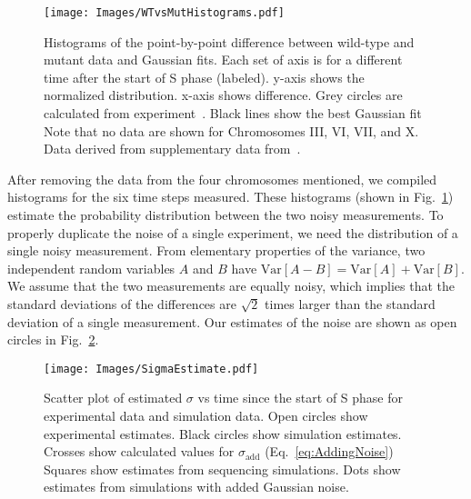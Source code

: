 		\begin{figure}[tbh]
			\begin{center}
				\texttt{[image: Images/WTvsMutHistograms.pdf]}
			\end{center}
				\caption[Estimating Experimental Noise: Point-By-Point Difference Distributions]{\label{fig:HistDifference} Histograms of the point-by-point difference between wild-type and mutant data and Gaussian fits.
					Each set of axis is for a different time after the start of S phase (labeled).
					y-axis shows the normalized distribution.
					x-axis shows difference.
					Grey circles are calculated from experiment~\cite{StochasticTermination}.
					Black lines show the best Gaussian fit
					Note that no data are shown for Chromosomes III, VI, VII, and X.
					Data derived from supplementary data from~\cite{StochasticTermination}.
				}
		\end{figure}
		
		After removing the data from the four chromosomes mentioned, we compiled histograms for the six time steps measured.
		These histograms (shown in Fig.~\ref{fig:HistDifference}) estimate the probability distribution between the two noisy measurements.
		To properly duplicate the noise of a single experiment, we need the distribution of a single noisy measurement.
		From elementary properties of the variance, two independent random variables $A$ and $B$ have $\text{Var}[A-B] = \text{Var}[A] + \text{Var}[B]$.
		We assume that the two measurements are equally noisy, which implies that the standard deviations of the differences are $\sqrt{2}$ times larger than the standard deviation of a single measurement.
		Our estimates of the noise are shown as open circles in Fig.~\ref{fig:Noise}.
		
		\begin{figure}[tbh]
			\begin{center}
				\texttt{[image: Images/SigmaEstimate.pdf]}
			\end{center}
				\caption[Scatter Plot of Estimated Simulation and Experimental Noise]{\label{fig:Noise} 
					Scatter plot of estimated $\sigma$ vs time since the start of S phase for experimental data and simulation data.
					Open circles show experimental estimates.
					Black circles show simulation estimates.
					Crosses show calculated values for $\sigma_\text{add}$ (Eq.~\ref{eq:AddingNoise})
					Squares show estimates from sequencing simulations.
					Dots show estimates from simulations with added Gaussian noise.
				}
		\end{figure}
		
